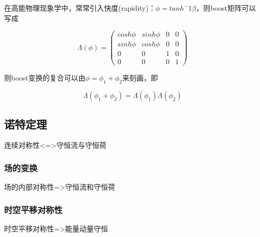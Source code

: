 在高能物理现象学中，常常引入快度(rapidity)：$\phi=tanh^-1\beta$，则boost矩阵可以写成

\begin{equation}
    \Lambda(\phi)=\left(\begin{matrix}
        cosh\phi & sinh\phi & 0 & 0 \\
        sinh\phi & cosh\phi & 0 & 0 \\
        0 & 0 & 1 & 0 \\
        0 & 0 & 0 & 1
    \end{matrix}\right)
\end{equation}

则boost变换的复合可以由$\phi=\phi_1+\phi_2$来刻画，即

\begin{equation}
    \Lambda(\phi_1+\phi_2)=\Lambda(\phi_1)\Lambda(\phi_2)
\end{equation}





\subsection{诺特定理}

连续对称性<=>守恒流与守恒荷

\subsubsection{场的变换}

场的内部对称性=>守恒流和守恒荷

\subsubsection{时空平移对称性}

时空平移对称性=>能量动量守恒